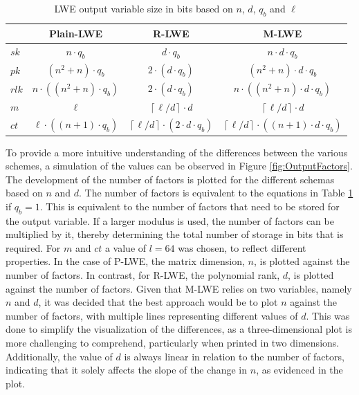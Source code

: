 \begin{table}[h]
  \centering
  \caption{LWE output variable size in bits based on $n$, $d$, $q_b$ and $\ell$}
  \begin{tabular}{|l|c|c|c|}
    \toprule
          & Plain-LWE                       & R-LWE                                                        & M-LWE                                                               \\
    \midrule
    $sk$  & $n \cdot q_b$                   & $d \cdot q_b$                                                & $n \cdot d \cdot q_b$                                               \\
    $pk$  & $(n^2 +n) \cdot q_b$            & $2 \cdot (d \cdot q_b)$                                      & $(n^2 + n)\cdot d \cdot q_b$                                        \\
    $rlk$ & $n \cdot ((n^2 +n) \cdot q_b)$  & $2 \cdot (d \cdot q_b)$                                      & $n \cdot ((n^2 + n)\cdot d \cdot q_b)$                              \\
    $m$   & $\ell$                          & $\left\lceil \ell/d \right\rceil \cdot d$                    & $\left\lceil \ell/d \right\rceil \cdot d$                           \\
    $ct$  & $\ell \cdot((n + 1) \cdot q_b)$ & $\left\lceil \ell/d \right\rceil \cdot(2 \cdot d \cdot q_b)$ & $\left\lceil \ell/d \right\rceil \cdot ((n + 1) \cdot d \cdot q_b)$ \\
    \bottomrule
    
  \end{tabular}
  \label{table:OutputVariableSize}
\end{table}

To provide a more intuitive understanding of the differences between the various schemes, a simulation of the values can be observed in Figure \ref{fig:OutputFactors}. The development of the number of factors is plotted for the different schemas based on $n$ and $d$. The number of factors is equivalent to the equations in Table \ref{table:OutputVariableSize} if $q_b=1$. This is equivalent to the number of factors that need to be stored for the output variable. If a larger modulus is used, the number of factors can be multiplied by it, thereby determining the total number of storage in bits that is required. For $m$ and $ct$ a value of $l=64$ was chosen, to reflect different properties. In the case of P-LWE, the matrix dimension, $n$, is plotted against the number of factors. In contrast, for R-LWE, the polynomial rank, $d$, is plotted against the number of factors. Given that M-LWE relies on two variables, namely $n$ and $d$, it was decided that the best approach would be to plot $n$ against the number of factors, with multiple lines representing different values of $d$. This was done to simplify the visualization of the differences, as a three-dimensional plot is more challenging to comprehend, particularly when printed in two dimensions. Additionally, the value of $d$ is always linear in relation to the number of factors, indicating that it solely affects the slope of the change in $n$, as evidenced in the plot.


